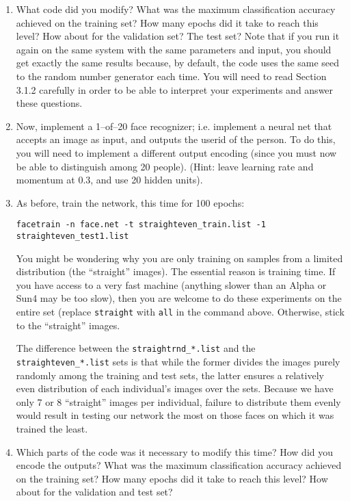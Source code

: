 \begin{enumerate}
\item What code did you modify?  What was the maximum classification accuracy 
achieved on the training set?  How many epochs did it take to reach this
level?  How about for the validation set?  The test set?  Note that if you run
it again on the same system with the same parameters and input, you should get
exactly the same results because, by default, the code uses the same seed to
the random number generator each time. You will need to read Section
3.1.2 carefully in order to be able to interpret your experiments and
answer these questions.

\item Now, implement a 1--of--20 face recognizer; i.e. implement a neural 
net that accepts an image as input, and outputs the userid of the person.  To
do this, you will need to implement a different output encoding (since you
must now be able to distinguish among 20 people).  (Hint: leave learning rate
and momentum at 0.3, and use 20 hidden units).

\item As before, train the network, this time for 100 epochs:

{\tt facetrain -n face.net -t straighteven\_train.list -1 straighteven\_test1.list}

You might be wondering why you are only training on samples from a limited
distribution (the ``straight'' images).  The essential reason is training
time.  If you have access to a very fast machine (anything slower than an
Alpha or Sun4 may be too slow), then you are welcome to do these experiments
on the entire set (replace {\tt straight} with {\tt all} in the command above.
Otherwise, stick to the ``straight'' images.

The difference between the {\tt straightrnd\_*.list} and the {\tt
straighteven\_*.list} sets is that while the former divides the images purely
randomly among the training and test sets, the latter ensures a relatively
even distribution of each individual's images over the sets.  Because we have
only 7 or 8 ``straight'' images per individual, failure to distribute them
evenly would result in testing our network the most on those faces on which it
was trained the least.

\item Which parts of the code was it necessary to modify this time?
How did you encode the outputs?  What was the maximum classification accuracy
achieved on the training set?  How many epochs did it take to reach this
level?  How about for the validation and test set?


\end{enumerate}

